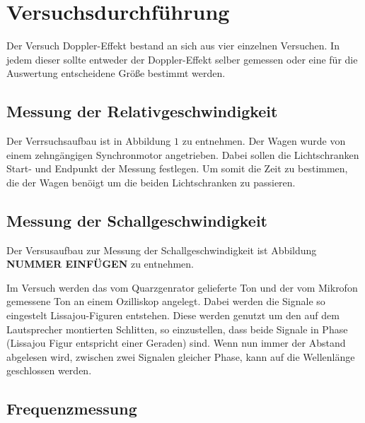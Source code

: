 
\section{Versuchsdurchführung}

Der Versuch Doppler-Effekt bestand an sich aus vier einzelnen Versuchen.
In jedem dieser sollte entweder der Doppler-Effekt selber gemessen oder eine
für die Auswertung entscheidene Größe bestimmt werden.

\subsection{Messung der Relativgeschwindigkeit}

%
%

Der Verrsuchsaufbau ist in Abbildung $1$ zu entnehmen.
Der Wagen wurde von einem zehngängigen Synchronmotor angetrieben.
Dabei sollen die Lichtschranken Start- und Endpunkt der Messung festlegen.
Um somit die Zeit zu bestimmen, die der Wagen benöigt um die beiden
Lichtschranken zu passieren.



\subsection{Messung der Schallgeschwindigkeit}

Der Versusaufbau zur Messung der Schallgeschwindigkeit ist
Abbildung \textbf{ NUMMER EINFÜGEN} zu entnehmen.

Im Versuch werden das vom Quarzgenrator gelieferte Ton und der
vom Mikrofon gemessene Ton an einem Ozilliskop angelegt.
Dabei werden die Signale so eingestelt Lissajou-Figuren entstehen.
Diese werden genutzt um den auf dem Lautsprecher montierten Schlitten, so
einzustellen, dass beide Signale in Phase (Lissajou Figur entspricht einer Geraden) sind.
Wenn nun immer der Abstand abgelesen wird, zwischen zwei
Signalen gleicher Phase, kann auf die Wellenlänge geschlossen werden.

\subsection{Frequenzmessung}

